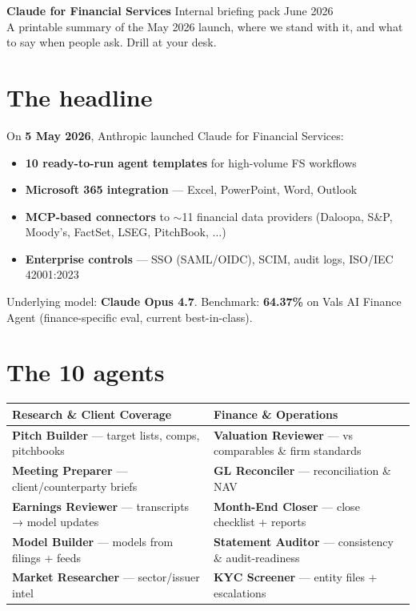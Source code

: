 \documentclass[10pt,a4paper]{article}
\newcommand{\hl}[1]{\textbf{\textcolor{accentpurple}{#1}}}
\begin{document}
\noindent
\begin{tcolorbox}[colback=darkgray, colframe=darkgray, fonttitle=\Large\bfseries\color{white}]
  \color{white}\textbf{\Large Claude for Financial Services} \hfill \small Internal briefing pack \quad\textbar\quad June 2026 \\[2pt]
  {\small A printable summary of the May 2026 launch, where we stand with it, and what to say when people ask. Drill at your desk.}
\end{tcolorbox}

\section*{The headline}

On \hl{5 May 2026}, Anthropic launched Claude for Financial Services:

\begin{itemize}
  \item \textbf{10 ready-to-run agent templates} for high-volume FS workflows
  \item \textbf{Microsoft 365 integration} — Excel, PowerPoint, Word, Outlook
  \item \textbf{MCP-based connectors} to $\sim$11 financial data providers (Daloopa, S\&P, Moody's, FactSet, LSEG, PitchBook, $\ldots$)
  \item \textbf{Enterprise controls} — SSO (SAML/OIDC), SCIM, audit logs, ISO/IEC 42001:2023
\end{itemize}

\noindent Underlying model: \hl{Claude Opus 4.7}. Benchmark: \hl{64.37\%} on Vals AI Finance Agent (finance-specific eval, current best-in-class).

\section*{The 10 agents}

\begin{tabularx}{\textwidth}{@{}p{} X@{}}
\toprule
\textbf{Research \& Client Coverage} & \textbf{Finance \& Operations} \\
\midrule
\textbf{Pitch Builder} — target lists, comps, pitchbooks & \textbf{Valuation Reviewer} — vs comparables \& firm standards \\
\textbf{Meeting Preparer} — client/counterparty briefs & \textbf{GL Reconciler} — reconciliation \& NAV \\
\textbf{Earnings Reviewer} — transcripts → model updates & \textbf{Month-End Closer} — close checklist + reports \\
\textbf{Model Builder} — models from filings + feeds & \textbf{Statement Auditor} — consistency \& audit-readiness \\
\textbf{Market Researcher} — sector/issuer intel & \textbf{KYC Screener} — entity files + escalations \\
\bottomrule
\end{tabularx}
\end{document}
